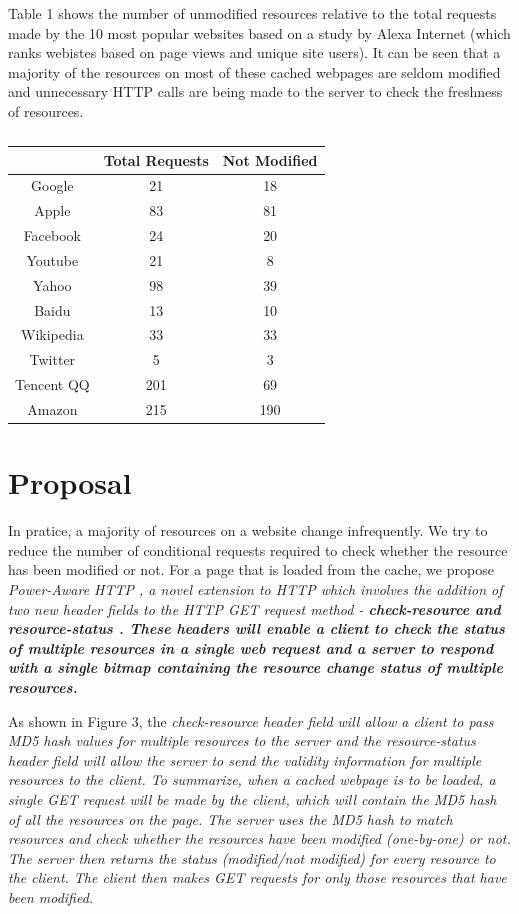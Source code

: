 \documentclass{sigplanconf}
\begin{document}
Table 1 shows the number of unmodified resources relative to the total requests made by the 10 most popular websites based on a study by Alexa Internet (which ranks webistes based on page views and unique site users). It can be seen that a majority of the resources on most of these cached webpages are seldom modified and unnecessary HTTP calls are being made to the server to check the freshness of resources.

\begin{table}[htbp]
\centering
\caption{}
\begin{tabular}{|c|c|c|}
\hline
 & \multicolumn{1}{l|}{Total Requests} & \multicolumn{1}{l|}{Not Modified} \\ \hline
Google & 21 & 18 \\ \hline
Apple & 83 & 81 \\ \hline
Facebook & 24 & 20 \\ \hline
Youtube & 21 & 8 \\ \hline
Yahoo & 98 & 39 \\ \hline
Baidu & 13 & 10 \\ \hline
Wikipedia & 33 & 33 \\ \hline
Twitter & 5 & 3 \\ \hline
Tencent QQ & 201 & 69 \\ \hline
Amazon & 215 & 190 \\ \hline
\end{tabular}
\label{}
\end{table}

\section{Proposal}

In pratice, a majority of resources on a website change infrequently. We try to reduce the number of conditional requests required to check whether the resource has been modified or not. For a page that is loaded from the cache, we propose \it{Power-Aware HTTP} \rm , a novel extension to HTTP which involves the addition of two new header fields to the HTTP GET request method - \bf{check-resource} \rm and \bf{resource-status} \rm. These headers will enable a client to check the status of multiple resources in a single web request and a server to respond with a single bitmap containing the resource change status of multiple resources.

As shown in Figure 3, the \it{check-resource} \rm header field will allow a client to pass MD5 hash values for multiple resources to the server and the \it{resource-status} \rm header field will allow the server to send the validity information for multiple resources to the client. To summarize, when a cached webpage is to be loaded, a single GET request will be made by the client, which will contain the MD5 hash of all the resources on the page. The server uses the MD5 hash to match resources and check whether the resources have been modified (one-by-one) or not. The server then returns the status (modified/not modified) for every resource to the client. The client then makes GET requests for only those resources that have been modified.
\end{document}

